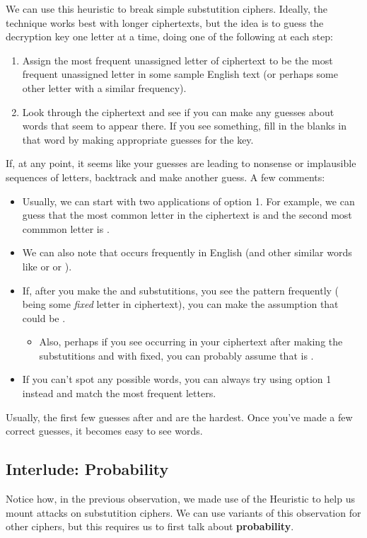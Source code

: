 \documentclass[letterpaper]{article}
\begin{document}
We can use this heuristic to break simple substutition ciphers. Ideally, the technique works best with longer ciphertexts, but the idea is to guess the decryption key one letter at a time, doing one of the following at each step: 
\begin{enumerate}
    \item Assign the most frequent unassigned letter of ciphertext to be the most frequent unassigned letter in some sample English text (or perhaps some other letter with a similar frequency).
    \item Look through the ciphertext and see if you can make any guesses about words that seem to appear there. If you see something, fill in the blanks in that word by making appropriate guesses for the key.
\end{enumerate}
If, at any point, it seems like your guesses are leading to nonsense or implausible sequences of letters, backtrack and make another guess. A few comments: 
\begin{itemize}
    \item Usually, we can start with two applications of option 1. For example, we can guess that the most common letter in the ciphertext is  and the second most commmon letter is . 
    \item We can also note that  occurs frequently in English (and other similar words like  or  or ). 
    \item If, after you make the  and  substutitions, you see the  pattern frequently (\code{*} being some \emph{fixed} letter in ciphertext), you can make the assumption that \code{*} could be . 
    \begin{itemize}
        \item Also, perhaps if you see  occurring in your ciphertext after making the substutitions and with \code{*} fixed, you can probably assume that \code{*} is . 
    \end{itemize}

    \item If you can't spot any possible words, you can always try using option 1 instead and match the most frequent letters. 
\end{itemize}
Usually, the first few guesses after  and  are the hardest. Once you've made a few correct guesses, it becomes easy to see words.

\subsection{Interlude: Probability}
Notice how, in the previous observation, we made use of the Heuristic to help us mount attacks on substutition ciphers. We can use variants of this observation for other ciphers, but this requires us to first talk about \textbf{probability}.
\end{document}
